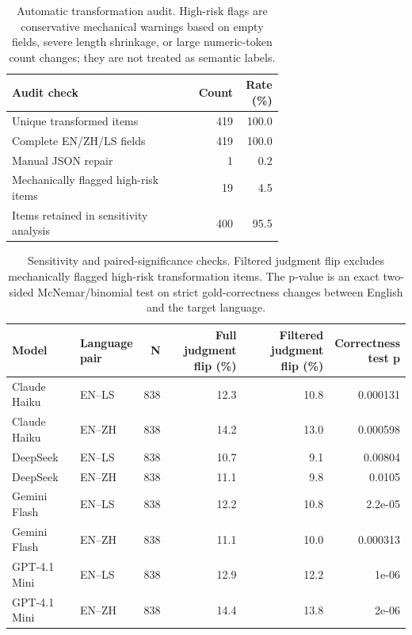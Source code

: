 \begin{table}[t]
\centering
\small
\setlength{\tabcolsep}{4pt}
\renewcommand{\arraystretch}{1.08}
\begin{tabular}{p{0.68\linewidth}rr}
\hline
Audit check & Count & \shortstack{Rate\\(\%)} \\
\hline
Unique transformed items & 419 & 100.0 \\
Complete EN/ZH/LS fields & 419 & 100.0 \\
Manual JSON repair & 1 & 0.2 \\
Mechanically flagged high-risk items & 19 & 4.5 \\
Items retained in sensitivity analysis & 400 & 95.5 \\
\hline
\end{tabular}
\caption{Automatic transformation audit. High-risk flags are conservative mechanical warnings based on empty fields, severe length shrinkage, or large numeric-token count changes; they are not treated as semantic labels.}
\label{tab:variant-audit}
\end{table}

\begin{table}[t]
\centering
\small
\setlength{\tabcolsep}{6pt}
\renewcommand{\arraystretch}{1.08}
\begin{tabular}{llrrrr}
\hline
Model & \shortstack{Language\\pair} & N & \shortstack{Full judgment\\flip (\%)} & \shortstack{Filtered judgment\\flip (\%)} & \shortstack{Correctness\\test p} \\
\hline
Claude Haiku & EN--LS & 838 & 12.3 & 10.8 & 0.000131 \\
Claude Haiku & EN--ZH & 838 & 14.2 & 13.0 & 0.000598 \\
DeepSeek & EN--LS & 838 & 10.7 & 9.1 & 0.00804 \\
DeepSeek & EN--ZH & 838 & 11.1 & 9.8 & 0.0105 \\
Gemini Flash & EN--LS & 838 & 12.2 & 10.8 & 2.2e-05 \\
Gemini Flash & EN--ZH & 838 & 11.1 & 10.0 & 0.000313 \\
GPT-4.1 Mini & EN--LS & 838 & 12.9 & 12.2 & 1e-06 \\
GPT-4.1 Mini & EN--ZH & 838 & 14.4 & 13.8 & 2e-06 \\
\hline
\end{tabular}
\caption{Sensitivity and paired-significance checks. Filtered judgment flip excludes mechanically flagged high-risk transformation items. The p-value is an exact two-sided McNemar/binomial test on strict gold-correctness changes between English and the target language.}
\label{tab:sensitivity-significance}
\end{table}
